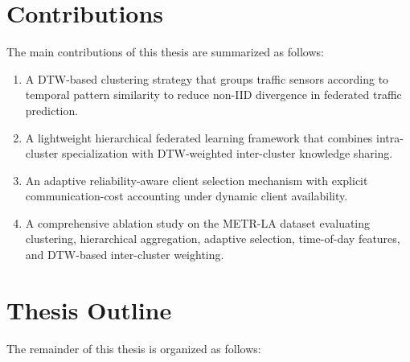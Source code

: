 \section{Contributions}

The main contributions of this thesis are summarized as follows:

\begin{enumerate}
    \item A DTW-based clustering strategy that groups traffic sensors according to temporal pattern similarity to reduce non-IID divergence in federated traffic prediction.
    \item A lightweight hierarchical federated learning framework that combines intra-cluster specialization with DTW-weighted inter-cluster knowledge sharing.
    \item An adaptive reliability-aware client selection mechanism with explicit communication-cost accounting under dynamic client availability.
    \item A comprehensive ablation study on the METR-LA dataset evaluating clustering, hierarchical aggregation, adaptive selection, time-of-day features, and DTW-based inter-cluster weighting.
\end{enumerate}

\section{Thesis Outline}
The remainder of this thesis is organized as follows:

